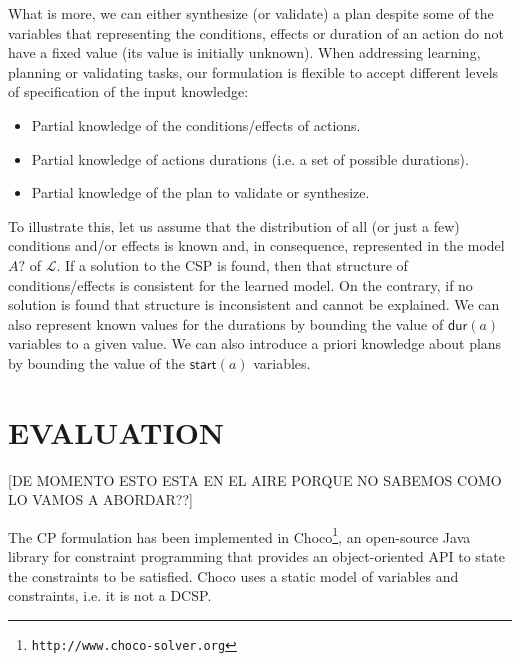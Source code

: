 \documentclass{ecai}
\newcommand{\dur}{\mathsf{dur}}    %
\newcommand{\start}{\mathsf{start}}%
\begin{document}
What is more, we can either synthesize (or validate) a plan despite some of the variables that representing the conditions, effects or duration of an action do not have a fixed value (its value is initially unknown). When addressing learning, planning or validating tasks, our formulation is flexible to accept different levels of specification of the input knowledge:

\begin{itemize}
\item Partial knowledge of the conditions/effects of actions.
\item Partial knowledge of actions durations (i.e. a set of possible durations).
\item Partial knowledge of the plan to validate or synthesize.
\end{itemize}

To illustrate this, let us assume that the distribution of all (or just a few) conditions and/or effects is known and, in consequence, represented in the model $A?$ of $\mathcal{L}$. If a solution to the CSP is found, then that structure of conditions/effects is consistent for the learned model. On the contrary, if no solution is found that structure is inconsistent and cannot be explained. We can also represent known values for the durations by bounding the value of $\dur(a)$ variables to a given value. We can also introduce a priori knowledge about plans by bounding the value of the $\start(a)$ variables.



\section{EVALUATION}
\label{sec:evaluation}

[DE MOMENTO ESTO ESTA EN EL AIRE PORQUE NO SABEMOS COMO LO VAMOS A ABORDAR??]

The CP formulation has been implemented in \textsf{Choco}\footnote{\texttt{http://www.choco-solver.org}}, an open-source Java library for constraint programming that provides an object-oriented API to state the constraints to be satisfied. \textsf{Choco} uses a static model of variables and constraints, i.e. it is not a DCSP.
\end{document}

